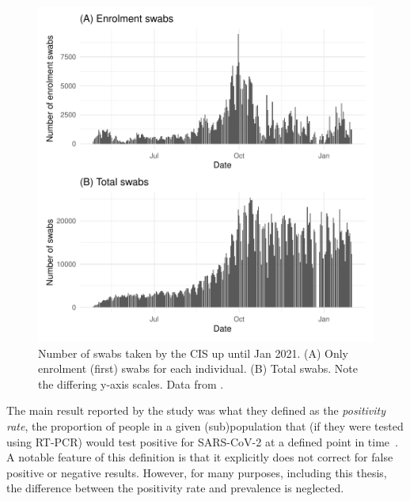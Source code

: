 \documentclass[thesis.tex]{subfiles}
\begin{document}
\begin{figure}
  \centering \includegraphics{biology-data/CIS-recruitment}
  \caption[CIS swab numbers]{%
    Number of swabs taken by the CIS up until Jan 2021.
    (A) Only enrolment (\ie first) swabs for each individual.
    (B) Total swabs.
    Note the differing y-axis scales.
    Data from \textcite{CIStechData}.
  }
  \label{biology-data:fig:CIS-recruitment}
\end{figure}


The main result reported by the study was what they defined as the \emph{positivity rate}, the proportion of people in a given (sub)population that (if they were tested using RT-PCR) would test positive for SARS-CoV-2 at a defined point in time~\autocite{cisMethodsONS}.
A notable feature of this definition is that it explicitly does not correct for false positive or negative results.
However, for many purposes, including this thesis, the difference between the positivity rate and prevalence is neglected.
\end{document}
